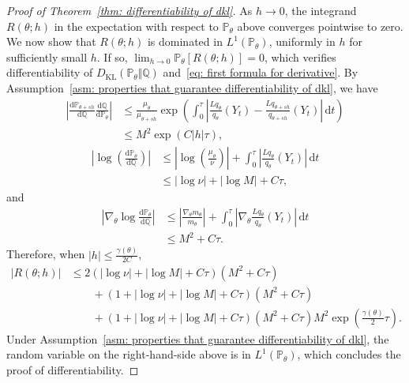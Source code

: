 \documentclass[reqno]{amsart}
\newcommand{\1}{\mathds{1}}
\renewcommand{\d}{\mathrm{d}}
\newcommand{\grad}{\nabla}
\renewcommand{\P}{\mathds{P}}
\newcommand{\Q}{\mathds{Q}}
\newcommand{\dkl}{D_{\mathrm{KL}}}
\theoremstyle{definition}
\theoremstyle{remark}
\begin{document}
\begin{proof}[Proof of Theorem~\ref{thm: differentiability of dkl}]
  As $h \rightarrow 0$, the integrand $R(\theta; h)$ in the expectation with respect to $\P_\theta$ above converges pointwise to zero.  We now show that $R(\theta; h)$ is dominated in $L^1(\P_\theta)$, uniformly in $h$ for sufficiently small $h$. If so, $\lim_{h \rightarrow 0} \P_\theta [R(\theta; h)] =0$, which verifies differentiability of $\dkl (\P_\theta \Vert \Q)$ and~\eqref{eq: first formula for derivative}.
  By Assumption~\ref{asm: properties that guarantee differentiability of dkl}, we have
  \begin{align*}
    \left \lvert \frac{\d \P_{\theta+s h}}{\d \Q} \frac{\d \Q}{\d \P_\theta} \right \rvert &\leq \frac{\mu_\theta}{\mu_{\theta+sh}} \exp \left (\int_0^\tau \left \lvert \frac{Lq_\theta}{q_\theta}(Y_t) - \frac{Lq_{\theta+sh}}{q_{\theta+sh}}(Y_t) \right \rvert \, \d t \right ) \\
    &\leq M^2 \exp ( C\lvert h \rvert \tau),  
  \end{align*}
  \begin{align*}
    \left \lvert \log \left (  \frac{\d \P_{\theta}}{\d \Q} \right ) \right \rvert
    &\leq  \left \lvert \log \left ( \frac{\mu_\theta}{\nu} \right ) \right \rvert  +  \int_0^\tau \left \lvert  \frac{L q_\theta}{q_\theta}(Y_t) \right \rvert  \, \d t \\
    &\leq \lvert \log \nu \rvert + \lvert \log M \rvert + C \tau, 
  \end{align*}
  and
  \begin{align*}
    \left \lvert \grad_\theta \log \frac{\d \P_{\theta}}{\d \Q} \right \rvert &\leq \left \lvert \frac{\grad_\theta m_\theta}{m_\theta} \right \rvert + \int_0^\tau \left \lvert \grad_\theta  \frac{L q_\theta}{q_\theta}(Y_t) \right \rvert \, \d t  \\
    &\leq M^2 + C \tau.
  \end{align*}
  Therefore, when $\lvert h \rvert \leq \frac{\gamma(\theta)}{2C}$, 
  \begin{align*}
    \lvert R(\theta; h) \rvert &\leq 2(\lvert \log \nu \rvert + \lvert \log M \rvert + C \tau)(M^2+C\tau)\\
                 &\qquad + (1+\lvert \log \nu \rvert + \lvert \log M \rvert + C \tau)(M^2+C\tau) \\
                 &\qquad + (1+\lvert \log \nu \rvert + \lvert \log M \rvert + C \tau) (M^2+C\tau)  M^2 \exp \left ( \frac{\gamma(\theta)}{2} \tau \right).
  \end{align*}
  Under Assumption~\ref{asm: properties that guarantee differentiability of dkl}, the random variable on the right-hand-side above is in $L^1(\P_\theta)$, which concludes the proof of differentiability. 
  

\end{proof}
\end{document}
